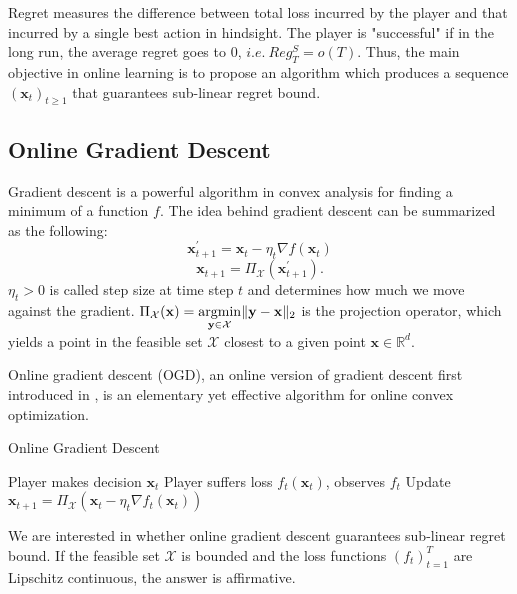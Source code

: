 \documentclass[12pt, a4paper]{report}
\begin{document}
Regret measures the difference between total loss incurred by the player and that incurred by a single best action in hindsight. The player is "successful" if in the long run, the average regret goes to 0, $i.e.\ Reg_{T}^S = o(T)$.
Thus, the main objective in online learning is to propose an algorithm which produces a sequence $(\mathbf{x}_t)_{t \geq 1}$ that guarantees sub-linear regret bound.

\subsection{Online Gradient Descent}
Gradient descent is a powerful algorithm in convex analysis for finding a minimum of a function $f$. The idea behind gradient descent can be summarized as the following:
\begin{equation*}
    \mathbf{x}_{t+1}^\prime = \mathbf{x}_t - \eta_t \nabla f(\mathbf{x}_t)
\end{equation*}
\begin{equation*}
    \mathbf{x}_{t+1} = \Pi_\mathcal{X} (\mathbf{x}_{t+1}^\prime).
\end{equation*}    
$\eta_t > 0$ is called step size at time step $t$ and determines how much we move against the gradient. $\displaystyle \Pi_\mathcal{X}(\mathbf{x}) = \operatorname*{argmin}_{\mathbf{y} \in \mathcal{X}} \lVert \mathbf{y} - \mathbf{x} \rVert_{2}$ is the projection operator, which yields a point in the feasible set $\mathcal{X}$ closest to a given point $\mathbf{x} \in \mathbb{R}^d$. 

Online gradient descent (OGD), an online version of gradient descent first introduced in \cite{Zinkevich2003OnlineCP}, is an elementary yet effective algorithm for online convex optimization. 
\begin{algorithm}
\caption{Online Gradient Descent}\label{alg:ogd}
\begin{algorithmic}[1]
\State Player makes decision $\mathbf{x}_t$
\State Player suffers loss $f_t(\mathbf{x}_t)$, observes $f_t$
\State Update $\mathbf{x}_{t+1} = \Pi_{\mathcal{X}} (\mathbf{x}_t - \eta_t \nabla f_t(\mathbf{x}_t))$
\EndFor
\end{algorithmic}
\end{algorithm}

We are interested in whether online gradient descent guarantees sub-linear regret bound. If the feasible set $\mathcal{X}$ is bounded and the loss functions $(f_t)_{t=1}^T$ are Lipschitz continuous, the answer is affirmative.
\end{document}
